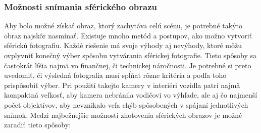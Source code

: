 \documentclass[slovak,master,dept460,male,cpp,cpdeclaration]{diploma}
\begin{document}
\subsubsection*{Možnosti snímania sférického obrazu}
Aby  bolo možné získať obraz, ktorý zachytáva celú scénu, je potrebné takýto obraz najskôr nasmínať. Existuje mnoho metód a postupov, ako možno vytvoriť sférickú fotografiu. Každé riešenie má svoje výhody aj nevýhody, ktoré môžu ovplyvniť konečný výber spôsobu vytvárania sférickej fotografie. Tieto spôsoby sa  častokrát líšia najmä vo finančnej, či technickej náročnosti.  Je potrebné si preto uvedomiť, či  výsledná fotografia musí spĺňať rôzne kritéria a podľa toho prispôsobiť výber. Pri použití takejto kamery v interiéri vozidla patrí najmä kompaktná veľkosť, aby kamera nebránila vodičovi vo výhľade, ale aj čo najmenší počet objektívov, aby nevznikalo veľa chýb spôsobených v spájaní jednotlivých snímok. Medzi najbežnejšie možnosti zhotovenia sférických obrazov je možné zaradiť tieto spôsoby:
\end{document}
